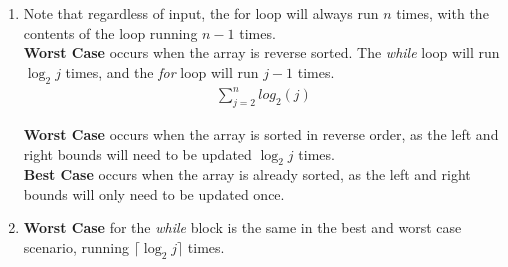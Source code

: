 \documentclass{article}
\begin{document}
\begin{enumerate}
    \item
          Note that regardless of input, the for loop will always run $n$ times, with the contents of the loop running $n - 1$ times. \\

          \textbf{Worst Case} occurs when the array is reverse sorted. The \textit{while} loop will run \(\log_2 j\) times, and the \textit{for} loop will run \(j - 1\) times.\\
          \begin{align*}
              \sum_{j=2}^{n}{log_2(j)}
          \end{align*}

          \textbf{Worst Case} occurs when the array is sorted in reverse order, as the left and right bounds will need to be updated \(\log_2 j\) times.\\
          \textbf{Best Case} occurs when the array is already sorted, as the left and right bounds will only need to be updated once.\\
    \item \textbf{Worst Case} for the \textit{while} block is the same in the best and worst case scenario, running \(\lceil \log_2 j \rceil\) times.\\
\end{enumerate}
\end{document}
